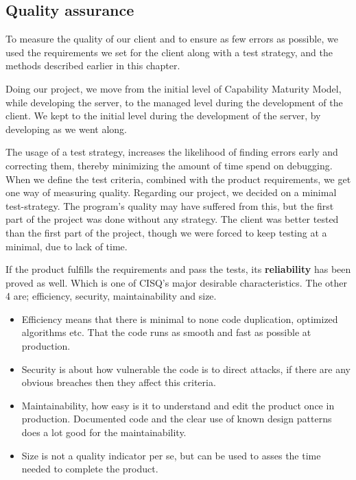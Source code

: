 \subsection{Quality assurance}
To measure the quality of our client and to ensure as few errors as possible, we used the requirements we set for the client along with a test strategy, and the methods described earlier in this chapter. 

Doing our project, we move from the initial level of Capability Maturity Model, while developing the server, to the managed level during the development of the client. We kept to the initial level during the development of the server, by developing as we went along.

The usage of a test strategy, increases the likelihood of finding errors early and correcting them, thereby minimizing the amount of time spend on debugging. When we define the test criteria, combined with the product requirements, we get one way of measuring quality.
Regarding our project, we decided on a minimal test-strategy. The program's quality may have suffered from this, but the first part of the project was done without any strategy. The client was better tested than the first part of the project, though we were forced to keep testing at a minimal, due to lack of time.

If the product fulfills the requirements and pass the tests, its \textbf{reliability} has been proved as well. Which is one of CISQ's  major desirable characteristics. The other 4 are; efficiency, security, maintainability and size.
\begin{itemize}
	\item Efficiency means that there is minimal to none code duplication, optimized algorithms etc. That the code runs as smooth and fast as possible at production.
	\item Security is about how vulnerable the code is to direct attacks, if there are any obvious breaches then they affect this criteria.
	\item Maintainability, how easy is it to understand and edit the product once in production. Documented code and the clear use of known design patterns does a lot good for the maintainability. 
	\item Size is not a quality indicator per se, but can be used to asses the time needed to complete the product. 
\end{itemize} 
 
